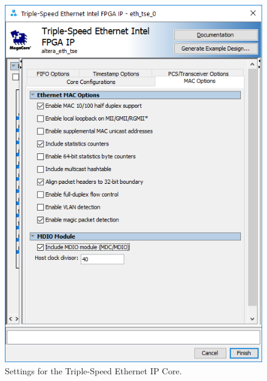 \documentclass[11pt, twoside, pdftex]{article}
\begin{document}
\begin{enumerate}
		\begin{figure}[H]
			\centering
			  \includegraphics[scale=0.65]{figures/tse_ethernet_settings.png}
			\caption{Settings for the Triple-Speed Ethernet IP Core.} 
			\label{fig:tse_ethernet_settings}
		\end{figure}


\end{enumerate}
\end{document}
